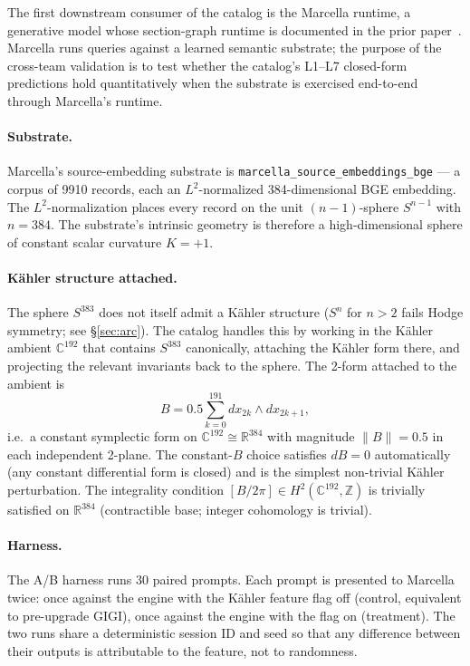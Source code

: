 \documentclass[11pt,letterpaper]{article}
\begin{document}
The first downstream consumer of the catalog is the Marcella
runtime, a generative model whose section-graph runtime is
documented in the prior paper~\cite{davis2026sheafcomposition}.
Marcella runs queries against a learned semantic substrate; the
purpose of the cross-team validation is to test whether the
catalog's L1--L7 closed-form predictions hold quantitatively when
the substrate is exercised end-to-end through Marcella's runtime.

\paragraph{Substrate.}
Marcella's source-embedding substrate is
\texttt{marcella\_source\_embeddings\_bge} --- a corpus of 9910
records, each an $L^2$-normalized 384-dimensional BGE embedding.
The $L^2$-normalization places every record on the unit
$(n-1)$-sphere $S^{n-1}$ with $n = 384$. The substrate's intrinsic
geometry is therefore a high-dimensional sphere of constant scalar
curvature $K = +1$.

\paragraph{K\"ahler structure attached.}
The sphere $S^{383}$ does not itself admit a K\"ahler structure
($S^n$ for $n > 2$ fails Hodge symmetry; see \S\ref{sec:arc}). The
catalog handles this by working in the K\"ahler ambient
$\mathbb{C}^{192}$ that contains $S^{383}$ canonically, attaching
the K\"ahler form there, and projecting the relevant invariants
back to the sphere. The 2-form attached to the ambient is
\[
B = 0.5 \sum_{k=0}^{191} dx_{2k} \wedge dx_{2k+1},
\]
i.e.\ a constant symplectic form on $\mathbb{C}^{192} \cong
\mathbb{R}^{384}$ with magnitude $\|B\| = 0.5$ in each independent
2-plane. The constant-$B$ choice satisfies $dB = 0$ automatically
(any constant differential form is closed) and is the simplest
non-trivial K\"ahler perturbation. The integrality condition
$[B / 2\pi] \in H^2(\mathbb{C}^{192}, \mathbb{Z})$ is trivially
satisfied on $\mathbb{R}^{384}$ (contractible base; integer
cohomology is trivial).

\paragraph{Harness.}
The A/B harness runs 30 paired prompts. Each prompt is presented
to Marcella twice: once against the engine with the K\"ahler
feature flag off (control, equivalent to pre-upgrade GIGI), once
against the engine with the flag on (treatment). The two runs share
a deterministic session ID and seed so that any difference between
their outputs is attributable to the feature, not to randomness.
\end{document}
